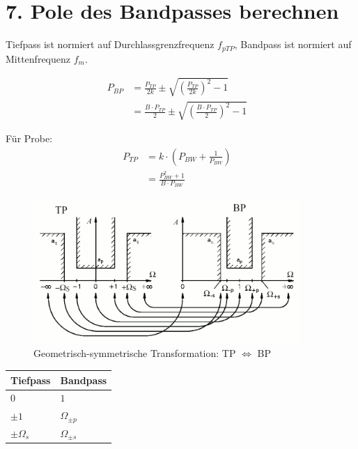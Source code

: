 \documentclass[a4paper, 12pt]{report}
\begin{document}
\clearpage

\section*{7. Pole des Bandpasses berechnen}

	Tiefpass ist normiert auf Durchlassgrenzfrequenz $ f_{pTP} $, Bandpass ist normiert auf Mittenfrequenz $ f_m $.
	
	\begin{minipage}[t]{0.5\textwidth}
		\vspace{-0.5cm}
		\begin{align*}
			P_{BP} &= \frac{P_{TP}}{2k} \pm \sqrt{\left( \frac{P_{TP}}{2k} \right)^2 - 1} &\\
			&= \frac{B \cdot P_{TP}}{2} \pm \sqrt{\left( \frac{B \cdot P_{TP}}{2} \right)^2 - 1} &
		\end{align*}
	\end{minipage}
	\begin{minipage}[t]{0.5\textwidth}
		\vspace{-0.5cm}
		Für Probe:
		\vspace{-0.15cm}
		\begin{align*}
			P_{TP} &= k \cdot \left(P_{BW} + \frac{1}{P_{BW}}\right) &\\
			&= \frac{P^2_{BW} + 1}{B \cdot P_{BW}} &
		\end{align*}
	\end{minipage}
	
	\begin{figure}[H]
		\centering
		\includegraphics[width=0.9\textwidth]{images/tiefpass-bandpass-transformation.png}
		\caption{Geometrisch-symmetrische Transformation: TP $ \Leftrightarrow $ BP}
	\end{figure}
	
	\begin{center}
		\begin{tabular}{|C{3cm}|C{3cm}|}
		\hline \textbf{Tiefpass} & \textbf{Bandpass} \\ 
		\hline $ 0 $ & $ 1 $ \\ 
		\hline $ \pm 1 $ & $ \Omega_{\pm p} $ \\ 
		\hline $ \pm \Omega_s $ & $ \Omega_{\pm s} $ \\ 
		\hline 
		\end{tabular} 
	\end{center}
	
\end{document}
